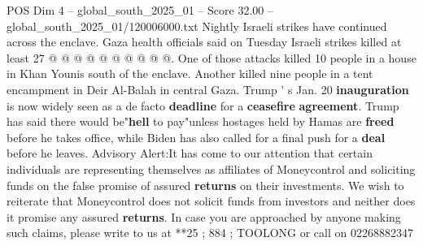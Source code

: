 \begin{textsample}{POS Dim 4 – global\_south\_2025\_01 – Score 32.00 – global\_south\_2025\_01/120006000.txt}
Nightly Israeli strikes have continued across the enclave.
Gaza health officials said on Tuesday Israeli strikes killed at least 27 @ @ @ @ @ @ @ @ @ @.
One of those attacks killed 10 people in a house in Khan Younis south of the enclave.
Another killed nine people in a tent encampment in Deir Al-Balah in central Gaza.
Trump ' s Jan. 20 \textbf{inauguration} is now widely seen as a de facto \textbf{deadline} for a \textbf{ceasefire} \textbf{agreement}.
Trump has said there would be"\textbf{hell} to pay"unless hostages held by Hamas are \textbf{freed} before he takes office, while Biden has also called for a final push for a \textbf{deal} before he leaves.
Advisory Alert:It has come to our attention that certain individuals are representing themselves as affiliates of Moneycontrol and soliciting funds on the false promise of assured \textbf{returns} on their investments.
We wish to reiterate that Moneycontrol does not solicit funds from investors and neither does it promise any assured \textbf{returns}.
In case you are approached by anyone making such claims, please write to us at **25 ; 884 ; TOOLONG or call on 02268882347

\end{textsample}
